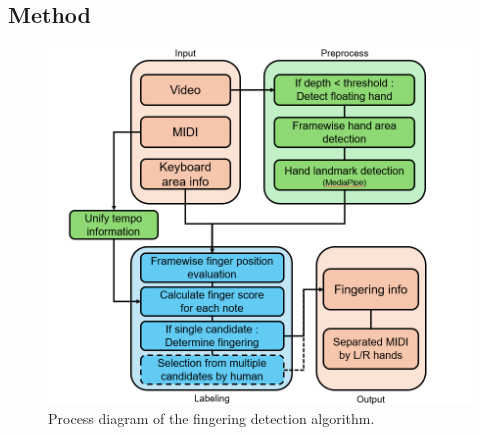 \documentclass{article}
\begin{document}
\subsection{Method}
% 
\begin{figure}
    \centering
    \includegraphics[width=\linewidth]{Images/fingering_detection.png}\hspace*{0cm}
    \caption{Process diagram of the fingering detection algorithm.}
    \label{fig:fingering_diagram}
\end{figure}
\end{document}
